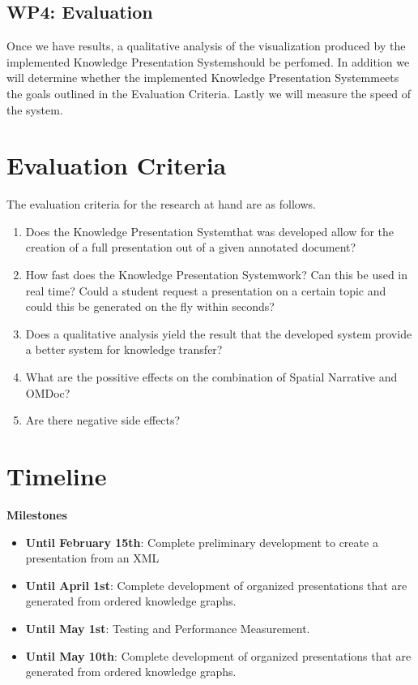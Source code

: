 \documentclass[twoside]{article}
\newcommand{\sys}{Knowledge Presentation System}
\begin{document}
\subsection{WP4: Evaluation}
Once we have results, a qualitative analysis of the visualization produced by the implemented \sys should be perfomed. In addition we will determine whether the implemented \sys meets the goals outlined in the Evaluation Criteria. Lastly we will measure the speed of the system.

\section{Evaluation Criteria}


The evaluation criteria for the research at hand are as follows. 
\begin{enumerate}
\item Does the \sys that was developed allow for the creation of a full presentation out of a given annotated document?
\item  How fast does the \sys work? Can this be used in real time? Could a student request a presentation on a certain topic and could this be generated on the fly within seconds?
\item Does a qualitative analysis yield the result that the developed system provide a better system for knowledge transfer?
\item What are the possitive effects on the combination of Spatial Narrative and OMDoc?
\item Are there negative side effects?
\end{enumerate}


\newpage
  \section{Timeline}

\textbf{Milestones}
\begin{itemize}
\item \textbf{Until February 15th}: Complete preliminary development to create a presentation from an XML
\item \textbf{Until April 1st}: Complete development of organized presentations that are generated from ordered knowledge graphs.
\item \textbf{Until May 1st}: Testing and Performance Measurement.
\item \textbf{Until May 10th}: Complete development of organized presentations that are generated from ordered knowledge graphs.
\end{itemize}
\end{document}
